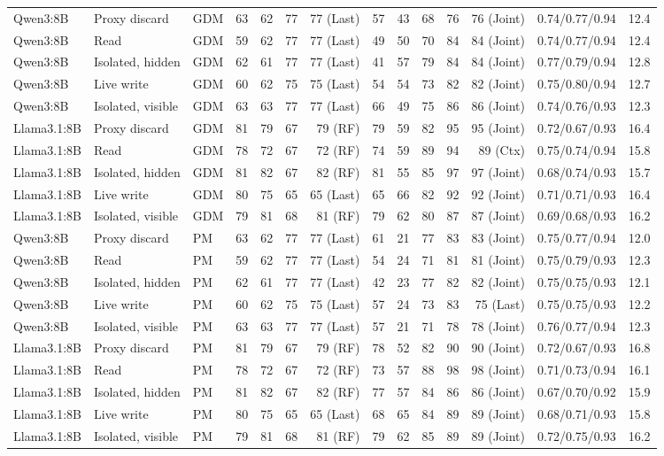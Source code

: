 \begin{table}[t]
\begin{tabularx}{\textwidth}{@{}lYlrrrrrrrrrrr@{}}
\addlinespace[3pt]
Qwen3:8B & Proxy discard & GDM & 63 & 62 & 77 & 77 (Last) & 57 & 43 & 68 & 76 & 76 (Joint) & 0.74/0.77/0.94 & 12.4 \\
Qwen3:8B & Read & GDM & 59 & 62 & 77 & 77 (Last) & 49 & 50 & 70 & 84 & 84 (Joint) & 0.74/0.77/0.94 & 12.4 \\
Qwen3:8B & Isolated, hidden & GDM & 62 & 61 & 77 & 77 (Last) & 41 & 57 & 79 & 84 & 84 (Joint) & 0.77/0.79/0.94 & 12.8 \\
Qwen3:8B & Live write & GDM & 60 & 62 & 75 & 75 (Last) & 54 & 54 & 73 & 82 & 82 (Joint) & 0.75/0.80/0.94 & 12.7 \\
Qwen3:8B & Isolated, visible & GDM & 63 & 63 & 77 & 77 (Last) & 66 & 49 & 75 & 86 & 86 (Joint) & 0.74/0.76/0.93 & 12.3 \\
Llama3.1:8B & Proxy discard & GDM & 81 & 79 & 67 & 79 (RF) & 79 & 59 & 82 & 95 & 95 (Joint) & 0.72/0.67/0.93 & 16.4 \\
Llama3.1:8B & Read & GDM & 78 & 72 & 67 & 72 (RF) & 74 & 59 & 89 & 94 & 89 (Ctx) & 0.75/0.74/0.94 & 15.8 \\
Llama3.1:8B & Isolated, hidden & GDM & 81 & 82 & 67 & 82 (RF) & 81 & 55 & 85 & 97 & 97 (Joint) & 0.68/0.74/0.93 & 15.7 \\
Llama3.1:8B & Live write & GDM & 80 & 75 & 65 & 65 (Last) & 65 & 66 & 82 & 92 & 92 (Joint) & 0.71/0.71/0.93 & 16.4 \\
Llama3.1:8B & Isolated, visible & GDM & 79 & 81 & 68 & 81 (RF) & 79 & 62 & 80 & 87 & 87 (Joint) & 0.69/0.68/0.93 & 16.2 \\
\addlinespace[3pt]
Qwen3:8B & Proxy discard & PM & 63 & 62 & 77 & 77 (Last) & 61 & 21 & 77 & 83 & 83 (Joint) & 0.75/0.77/0.94 & 12.0 \\
Qwen3:8B & Read & PM & 59 & 62 & 77 & 77 (Last) & 54 & 24 & 71 & 81 & 81 (Joint) & 0.75/0.79/0.93 & 12.3 \\
Qwen3:8B & Isolated, hidden & PM & 62 & 61 & 77 & 77 (Last) & 42 & 23 & 77 & 82 & 82 (Joint) & 0.75/0.75/0.93 & 12.1 \\
Qwen3:8B & Live write & PM & 60 & 62 & 75 & 75 (Last) & 57 & 24 & 73 & 83 & 75 (Last) & 0.75/0.75/0.93 & 12.2 \\
Qwen3:8B & Isolated, visible & PM & 63 & 63 & 77 & 77 (Last) & 57 & 21 & 71 & 78 & 78 (Joint) & 0.76/0.77/0.94 & 12.3 \\
Llama3.1:8B & Proxy discard & PM & 81 & 79 & 67 & 79 (RF) & 78 & 52 & 82 & 90 & 90 (Joint) & 0.72/0.67/0.93 & 16.8 \\
Llama3.1:8B & Read & PM & 78 & 72 & 67 & 72 (RF) & 73 & 57 & 88 & 98 & 98 (Joint) & 0.71/0.73/0.94 & 16.1 \\
Llama3.1:8B & Isolated, hidden & PM & 81 & 82 & 67 & 82 (RF) & 77 & 57 & 84 & 86 & 86 (Joint) & 0.67/0.70/0.92 & 15.9 \\
Llama3.1:8B & Live write & PM & 80 & 75 & 65 & 65 (Last) & 68 & 65 & 84 & 89 & 89 (Joint) & 0.68/0.71/0.93 & 15.8 \\
Llama3.1:8B & Isolated, visible & PM & 79 & 81 & 68 & 81 (RF) & 79 & 62 & 85 & 89 & 89 (Joint) & 0.72/0.75/0.93 & 16.2 \\
\bottomrule\end{tabularx}
\end{table}
